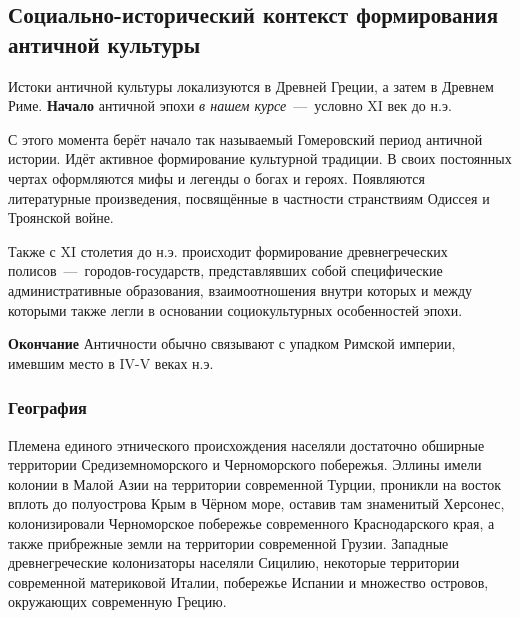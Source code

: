 \subsection{Социально-исторический контекст формирования античной культуры}

Истоки античной культуры локализуются в Древней Греции, а затем в Древнем Риме. 
\textbf{Начало} античной эпохи \textit{в нашем курсе}~---~условно XI век до н.э. 

С этого момента берёт начало так называемый Гомеровский период античной истории. Идёт активное формирование культурной традиции. В своих постоянных чертах оформляются мифы и легенды о богах и героях. Появляются литературные произведения, посвящённые в частности странствиям Одиссея и Троянской войне.

Также с XI столетия до н.э. происходит формирование древнегреческих полисов~---~городов-государств, представлявших собой специфические административные образования, взаимоотношения внутри которых и между которыми также легли в основании социокультурных особенностей эпохи. 

\textbf{Окончание} Античности обычно связывают с упадком Римской империи, имевшим место в IV-V веках н.э. 



\subsubsection{География}
Племена единого этнического происхождения населяли достаточно обширные территории
Средиземноморского и Черноморского побережья. Эллины имели колонии в Малой Азии на территории современной Турции, проникли на восток вплоть до полуострова Крым в Чёрном море, оставив там знаменитый Херсонес, колонизировали Черноморское побережье современного Краснодарского края, а также прибрежные земли на территории современной Грузии. Западные древнегреческие колонизаторы населяли Сицилию, некоторые территории современной материковой Италии, побережье Испании и множество островов, окружающих современную Грецию. 

